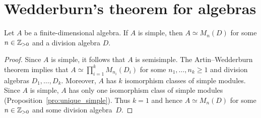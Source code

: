 \section{Wedderburn's theorem for algebras}

\begin{theorem}[Wedderburn]
	Let $A$ be a finite-dimensional algebra. If $A$ is simple, then 
	$A\simeq M_n(D)$ for some $n\in\mathbb{Z}_{>0}$ and a division algebra $D$. 
\end{theorem}

\begin{proof}
  Since $A$ is simple, it follows that $A$ is semisimple. The Artin--Wedderburn
  theorem implies that $A\simeq\prod_{i=1}^k M_{n_i}(D_i)$ for some
  $n_1,\dots,n_k\geq1$ and division algebras $D_1,\dots,D_k$. Moreover, $A$ has $k$
  isomorphism classes of simple modules. Since $A$ is simple, $A$ has only one
  isomorphism class of simple modules (Proposition~\ref{pro:unique_simple}).
  Thus $k=1$ and hence $A\simeq M_n(D)$ for some $n\in\mathbb{Z}_{>0}$ and some
  division algebra~$D$. 
\end{proof}

